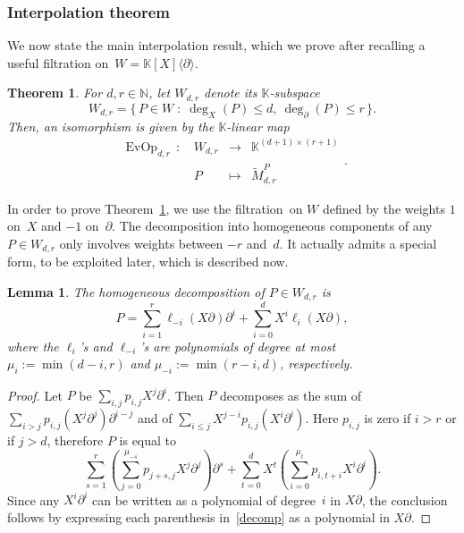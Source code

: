 \documentclass{sig-alt-full}
\newcommand{\x}{X}
\newcommand{\Dx}{\partial}
\newcommand{\bK}{\mathbb{K}}
\newcommand{\bN}{\mathbb{N}}
\newtheorem{lemma}{Lemma}
\newtheorem{theorem}{Theorem}
\def\tM{\tilde M}
\begin{document}
\subsubsection{Interpolation theorem}

We now state the main interpolation result, which we prove after recalling a useful filtration on~$W=\bK[\x]\langle\Dx\rangle$.

\begin{theorem}\label{interpol}
For $d,r\in\bN$, let $W_{d,r}$ denote its $\bK$-subspace
\[W_{d,r} = \lbrace\, P \in W \; : \;  \deg_{\x}(P) \leq d, \ \deg_\Dx(P) \leq r \,\rbrace.\]
Then, an isomorphism is given by the $\bK$-linear map
\[\begin{array}{lccc}
\operatorname{EvOp}_{d,r} \, : \, & W_{d,r} & \rightarrow & \bK^{(d+1)\times(r+1)}\\
                                                                           & P             & \mapsto  & \tM^P_{d,r}
\end{array}.\]
\end{theorem}

In order to prove Theorem~\ref{interpol}, we use the filtration~on $W$ defined by the weights $1$ on~$\x$ and $-1$ on~$\Dx$.
The decomposition into homogeneous components of any $P\in W_{d,r}$ only involves weights between $-r$ and~$d$.
It actually admits a special form, to be exploited later, which is described now.

\begin{lemma}\label{lem:b-hom-parts}
The homogeneous decomposition of $P\in W_{d,r}$ is
\[P = \sum_{i=1}^r \ell_{-i}(\x\Dx) \Dx^i + \sum_{i=0}^d \x^i \ell_i(\x\Dx),\]
where the $\ell_i$'s and $\ell_{-i}$'s are polynomials of degree at most $\mu_i:=\min(d-i,r)$ and $\mu_{-i}:=\min(r-i,d)$, respectively.
\end{lemma}

\begin{proof}
Let $P$ be $\sum_{i,j} p_{i,j} \x^j \Dx^i$.
Then $P$ decomposes as the sum of $\sum_{i>j} p_{i,j} (\x^j \Dx^j) \Dx^{i-j}$ and of $\sum_{i \leq j} \x^{j-i} p_{i,j} (\x^i \Dx^i)$.
Here $p_{i,j}$ is zero if $i>r$ or if $j>d$, therefore $P$ is equal to  
\begin{equation}\label{decomp}
	\sum_{s=1}^r \left(\sum_{j=0}^{\mu_{-s}} p_{j+s,j} \x^j \Dx^j \right) \Dx^s + \sum_{t=0}^d \x^t \left(\sum_{i=0}^{\mu_t} p_{i,t+i} \x^i \Dx^i \right).
\end{equation}	
Since any $\x^i \Dx^i$ can be written as a polynomial of degree~$i$ in $\x\Dx$, the conclusion follows by expressing each parenthesis in~\eqref{decomp} as a polynomial in $\x\Dx$.
\end{proof}
\end{document}
